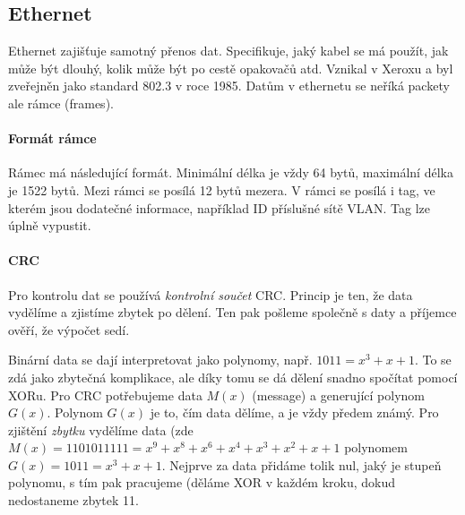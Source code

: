 \subsection{Ethernet}

Ethernet zajišťuje samotný přenos dat. Specifikuje, jaký kabel se má použít, jak může být dlouhý, kolik může být po cestě opakovačů atd. Vznikal v Xeroxu a byl zveřejněn jako standard 802.3 v roce 1985. Datům v ethernetu se neříká packety ale rámce (frames).

\paragraph{Formát rámce}

Rámec má následující formát. Minimální délka je vždy 64 bytů, maximální délka je 1522 bytů. Mezi rámci se posílá 12 bytů mezera. V rámci se posílá i tag, ve kterém jsou dodatečné informace, například ID příslušné sítě VLAN. Tag lze úplně vypustit.

\begin{table}[ht!]
\end{table}

\paragraph{CRC} Pro kontrolu dat se používá \textit{kontrolní součet} CRC. Princip je ten, že data vydělíme a zjistíme zbytek po dělení. Ten pak pošleme společně s daty a příjemce ověří, že výpočet sedí.

Binární data se dají interpretovat jako polynomy, např. $1011 = x^3 + x + 1$. To se zdá jako zbytečná komplikace, ale díky tomu se dá dělení snadno spočítat pomocí XORu. Pro CRC potřebujeme data $M(x)$ (message) a generující polynom $G(x)$. Polynom $G(x)$ je to, čím data dělíme, a je vždy předem známý. Pro zjištění \textit{zbytku} vydělíme data (zde $M(x) = 1101011111 = x^9 + x^8 + x^6 + x^4 + x^3 + x^2 + x + 1$ polynomem $G(x) = 1011 = x^3 + x + 1$. Nejprve za data přidáme tolik nul, jaký je stupeň polynomu, s tím pak pracujeme (děláme XOR v každém kroku, dokud nedostaneme zbytek 11.

